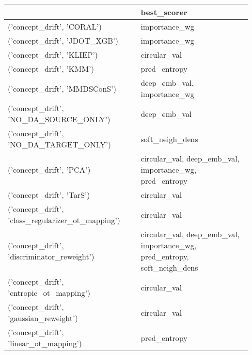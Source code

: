 \begin{tabular}{ll}
\hline
                                                     & best\_scorer                                                              \\
\hline
 ('concept\_drift', 'CORAL')                          & importance\_wg                                                            \\
 ('concept\_drift', 'JDOT\_XGB')                       & importance\_wg                                                            \\
 ('concept\_drift', 'KLIEP')                          & circular\_val                                                             \\
 ('concept\_drift', 'KMM')                            & pred\_entropy                                                             \\
 ('concept\_drift', 'MMDSConS')                       & deep\_emb\_val, importance\_wg                                              \\
 ('concept\_drift', 'NO\_DA\_SOURCE\_ONLY')              & deep\_emb\_val                                                             \\
 ('concept\_drift', 'NO\_DA\_TARGET\_ONLY')              & soft\_neigh\_dens                                                          \\
 ('concept\_drift', 'PCA')                            & circular\_val, deep\_emb\_val, importance\_wg, pred\_entropy                  \\
 ('concept\_drift', 'TarS')                           & circular\_val                                                             \\
 ('concept\_drift', 'class\_regularizer\_ot\_mapping')   & circular\_val                                                             \\
 ('concept\_drift', 'discriminator\_reweight')         & circular\_val, deep\_emb\_val, importance\_wg, pred\_entropy, soft\_neigh\_dens \\
 ('concept\_drift', 'entropic\_ot\_mapping')            & circular\_val                                                             \\
 ('concept\_drift', 'gaussian\_reweight')              & circular\_val                                                             \\
 ('concept\_drift', 'linear\_ot\_mapping')              & pred\_entropy                                                             \\

\end{tabular}
